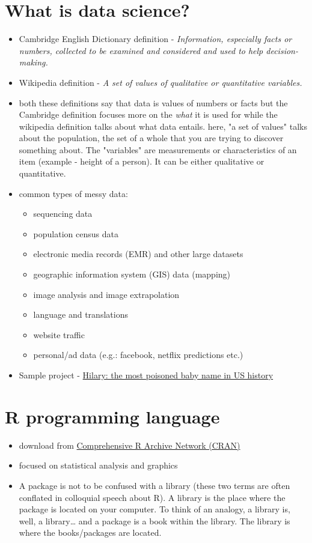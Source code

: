 \documentclass[11pt,fancy]{elegantbook}
\begin{document}
\section{What is data science?}
\begin{itemize}
    \item Cambridge English Dictionary definition - \textit{Information, especially facts or numbers, collected to be examined and considered and used to help decision-making.}
    \item Wikipedia definition - \textit{A set of values of qualitative or quantitative variables.}
    \item both these definitions say that data is values of numbers or facts but the Cambridge definition focuses more on the \textit{what} it is used for while the wikipedia definition talks about what data entails. here, "a set of values" talks about the population, the set of a whole that you are trying to discover something about. The "variables" are measurements or characteristics of an item (example - height of a person). It can be either qualitative or quantitative.
    \item common types of messy data:
          \begin{itemize}
              \item sequencing data
              \item population census data
              \item electronic media records (EMR) and other large datasets
              \item geographic information system (GIS) data (mapping)
              \item image analysis and image extrapolation
              \item language and translations
              \item website traffic
              \item personal/ad data (e.g.: facebook, netflix predictions etc.)
          \end{itemize}
    \item Sample project - \href{https://hilaryparker.com/2013/01/30/hilary-the-most-poisoned-baby-name-in-us-history/}{Hilary: the most poisoned baby name in US history}
\end{itemize}

\section{R programming language}
\begin{itemize}
    \item download from \href{https://cran.r-project.org/}{Comprehensive R Archive Network (CRAN)}
    \item focused on statistical analysis and graphics
    \item A package is not to be confused with a library (these two terms are often conflated in colloquial speech about R). A library is the place where the package is located on your computer. To think of an analogy, a library is, well, a library… and a package is a book within the library. The library is where the books/packages are located.
\end{itemize}
\end{document}
